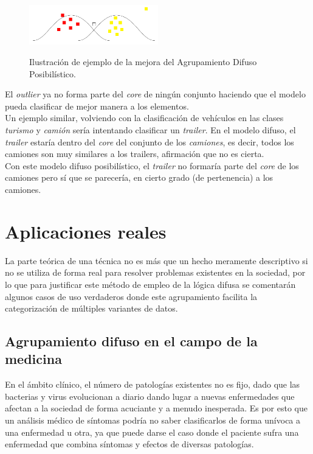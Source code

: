 \documentclass[]{report}
\begin{document}
			\begin{figure}[h]
				\centering
				\includegraphics[width=0.5\textwidth]{clustering-posibilistico.jpg}
				\label{clustering_posibilistico}
				\caption{Ilustración de ejemplo de la mejora del Agrupamiento Difuso Posibilístico.}
			\end{figure}
		
			El \textit{outlier} ya no forma parte del \textit{core} de ningún conjunto haciendo que el modelo pueda clasificar de mejor manera a los elementos.\\
			
			Un ejemplo similar, volviendo con la clasificación de vehículos en las clases \textit{turismo} y \textit{camión} sería intentando clasificar un \textit{trailer}. En el modelo difuso, el \textit{trailer} estaría dentro del \textit{core} del conjunto de los \textit{camiones}, es decir, todos los camiones son muy similares a los trailers, afirmación que no es cierta.\\
			
			Con este modelo difuso posibilístico, el \textit{trailer} no formaría parte del \textit{core} de los camiones pero sí que se parecería, en cierto grado (de pertenencia) a los camiones.

	\chapter{Aplicaciones reales}
	
		La parte teórica de una técnica no es más que un hecho meramente descriptivo si no se utiliza de forma real para resolver problemas existentes en la sociedad, por lo que para justificar este método de empleo de la lógica difusa se comentarán algunos casos de uso verdaderos donde este agrupamiento facilita la categorización de múltiples variantes de datos.\\
		
		\section{Agrupamiento difuso en el campo de la medicina}
		
			En el ámbito clínico, el número de patologías existentes no es fijo, dado que las bacterias y virus evolucionan a diario dando lugar a nuevas enfermedades que afectan a la sociedad de forma acuciante y a menudo inesperada. Es por esto que un análisis médico de síntomas podría no saber clasificarlos de forma unívoca a una enfermedad u otra, ya que puede darse el caso donde el paciente sufra una enfermedad que combina síntomas y efectos de diversas patologías.\\
			
\end{document}
